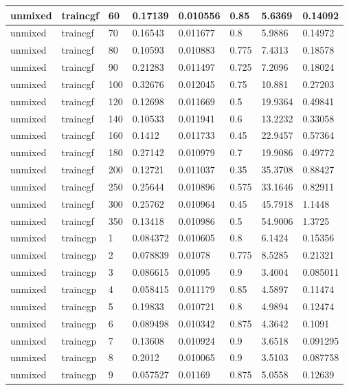 \begin{longtable}{llllllll}
unmixed & traincgf & 60 & 0.17139 & 0.010556 & 0.85 & 5.6369 & 0.14092 \\ \hline 
unmixed & traincgf & 70 & 0.16543 & 0.011677 & 0.8 & 5.9886 & 0.14972 \\ \hline 
unmixed & traincgf & 80 & 0.10593 & 0.010883 & 0.775 & 7.4313 & 0.18578 \\ \hline 
unmixed & traincgf & 90 & 0.21283 & 0.011497 & 0.725 & 7.2096 & 0.18024 \\ \hline 
unmixed & traincgf & 100 & 0.32676 & 0.012045 & 0.75 & 10.881 & 0.27203 \\ \hline 
unmixed & traincgf & 120 & 0.12698 & 0.011669 & 0.5 & 19.9364 & 0.49841 \\ \hline 
unmixed & traincgf & 140 & 0.10533 & 0.011941 & 0.6 & 13.2232 & 0.33058 \\ \hline 
unmixed & traincgf & 160 & 0.1412 & 0.011733 & 0.45 & 22.9457 & 0.57364 \\ \hline 
unmixed & traincgf & 180 & 0.27142 & 0.010979 & 0.7 & 19.9086 & 0.49772 \\ \hline 
unmixed & traincgf & 200 & 0.12721 & 0.011037 & 0.35 & 35.3708 & 0.88427 \\ \hline 
unmixed & traincgf & 250 & 0.25644 & 0.010896 & 0.575 & 33.1646 & 0.82911 \\ \hline 
unmixed & traincgf & 300 & 0.25762 & 0.010964 & 0.45 & 45.7918 & 1.1448 \\ \hline 
unmixed & traincgf & 350 & 0.13418 & 0.010986 & 0.5 & 54.9006 & 1.3725 \\ \hline 
unmixed & traincgp & 1 & 0.084372 & 0.010605 & 0.8 & 6.1424 & 0.15356 \\ \hline 
unmixed & traincgp & 2 & 0.078839 & 0.01078 & 0.775 & 8.5285 & 0.21321 \\ \hline 
unmixed & traincgp & 3 & 0.086615 & 0.01095 & 0.9 & 3.4004 & 0.085011 \\ \hline 
unmixed & traincgp & 4 & 0.058415 & 0.011179 & 0.85 & 4.5897 & 0.11474 \\ \hline 
unmixed & traincgp & 5 & 0.19833 & 0.010721 & 0.8 & 4.9894 & 0.12474 \\ \hline 
unmixed & traincgp & 6 & 0.089498 & 0.010342 & 0.875 & 4.3642 & 0.1091 \\ \hline 
unmixed & traincgp & 7 & 0.13608 & 0.010924 & 0.9 & 3.6518 & 0.091295 \\ \hline 
unmixed & traincgp & 8 & 0.2012 & 0.010065 & 0.9 & 3.5103 & 0.087758 \\ \hline 
unmixed & traincgp & 9 & 0.057527 & 0.01169 & 0.875 & 5.0558 & 0.12639 \\ \hline 

\end{longtable}
